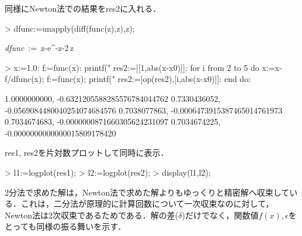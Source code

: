 同様にNewton法での結果をres2に入れる．
\begin{MapleInput}
> dfunc:=unapply(diff(func(z),z),z);
\end{MapleInput}
\begin{MapleOutput}
{\it dfunc}\, := \,z\mapsto -{{e}^{-z}}-2\,z
\end{MapleOutput}
\begin{MapleInput}
> x:=1.0: f:=func(x): 
  printf("%
  res2:=[[1,abs(x-x0)]]:
  for i from 2 to 5 do
    x:=x-f/dfunc(x);
    f:=func(x);
    printf("%
    res2:=[op(res2),[i,abs(x-x0)]]:
  end do:
\end{MapleInput}
\begin{MapleError}
1.0000000000, -0.6321205588285576784044762 
0.7330436052, -0.0569084480040254074684576 
0.7038077863, -0.0006473915387465014761973
0.7034674683, -0.0000000871660305624231097
0.7034674225, -0.0000000000000015809178420
\end{MapleError}

res1, res2を片対数プロットして同時に表示．
\begin{MapleInput}
> l1:=logplot(res1);
> l2:=logplot(res2);
> display(l1,l2);
\end{MapleInput}
2分法で求めた解は，Newton法で求めた解よりもゆっくりと精密解へ収束している．これは，二分法が原理的に計算回数について一次収束なのに対して，Newton法は2次収束であるためである．解の差($\delta$)だけでなく，関数値$f(x),\epsilon$をとっても同様の振る舞いを示す．
